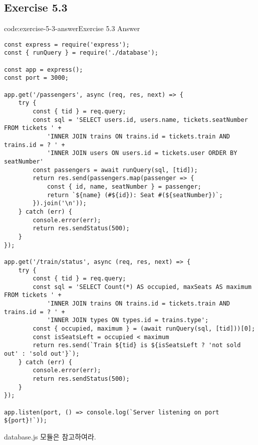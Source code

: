 \subsection*{Exercise 5.3}

\begin{codeenv}{code:exercise-5-3-answer}{Exercise 5.3 Answer}\begin{verbatim}
const express = require('express');
const { runQuery } = require('./database');

const app = express();
const port = 3000;

app.get('/passengers', async (req, res, next) => {
    try {
        const { tid } = req.query;
        const sql = 'SELECT users.id, users.name, tickets.seatNumber FROM tickets ' +
            'INNER JOIN trains ON trains.id = tickets.train AND trains.id = ? ' +
            'INNER JOIN users ON users.id = tickets.user ORDER BY seatNumber'
        const passengers = await runQuery(sql, [tid]);
        return res.send(passengers.map(passenger => {
            const { id, name, seatNumber } = passenger;
            return `${name} (#${id}): Seat #(${seatNumber})`;
        }).join('\n'));
    } catch (err) {
        console.error(err);
        return res.sendStatus(500);
    }
});

app.get('/train/status', async (req, res, next) => {
    try {
        const { tid } = req.query;
        const sql = 'SELECT Count(*) AS occupied, maxSeats AS maximum FROM tickets ' +
            'INNER JOIN trains ON trains.id = tickets.train AND trains.id = ? ' +
            'INNER JOIN types ON types.id = trains.type';
        const { occupied, maximum } = (await runQuery(sql, [tid]))[0];
        const isSeatsLeft = occupied < maximum
        return res.send(`Train ${tid} is ${isSeatsLeft ? 'not sold out' : 'sold out'}`);
    } catch (err) {
        console.error(err);
        return res.sendStatus(500);
    }
});

app.listen(port, () => console.log(`Server listening on port ${port}!`));
\end{verbatim}
\end{codeenv}

database.js 모듈은 \과 \를 참고하여라.
